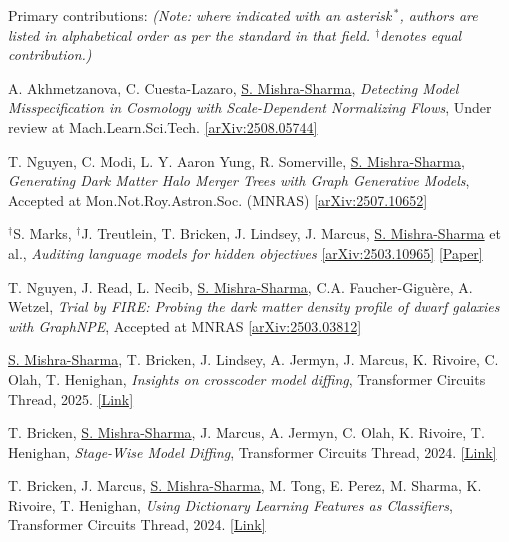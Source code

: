 \documentclass[letterpaper,11pt]{article}
\newenvironment{packed_enumerate}[1][]{
\begin{etaremune}[#1]
  \setlength{\itemsep}{4.0pt}
  \setlength{\parskip}{0pt}
  \setlength{\parsep}{0pt}}{\end{etaremune}
}
\begin{document}
\noindent
Primary contributions: \emph{(Note: where indicated with an asterisk\,$^*$, authors are listed in alphabetical order as per the standard in that field. $^{\dagger}$denotes equal contribution.)}

\begin{packed_enumerate}[start=56]

\item A. Akhmetzanova, C. Cuesta-Lazaro, \underline{S. Mishra-Sharma}, \emph{Detecting Model Misspecification in Cosmology with Scale-Dependent Normalizing Flows}, Under review at Mach.Learn.Sci.Tech.  \href{https://arxiv.org/abs/2508.05744}{[arXiv:2508.05744]}

\item T. Nguyen, C. Modi, L. Y. Aaron Yung, R. Somerville, \underline{S. Mishra-Sharma}, \emph{Generating Dark Matter Halo Merger Trees with Graph Generative Models}, Accepted at Mon.Not.Roy.Astron.Soc. (MNRAS) \href{https://arxiv.org/abs/2507.10652}{[arXiv:2507.10652]}

\item $^{\dagger}$S. Marks, $^{\dagger}$J. Treutlein, T. Bricken, J. Lindsey, J. Marcus, \underline{S. Mishra-Sharma}  et al., \emph{Auditing language models for hidden objectives} \href{https://arxiv.org/abs/2503.10965}{[arXiv:2503.10965]} \href{https://assets.anthropic.com/m/317564659027fb33/original/Auditing-Language-Models-for-Hidden-Objectives.pdf}{[Paper]}
\item T. Nguyen, J. Read, L. Necib, \underline{S. Mishra-Sharma}, C.A. Faucher-Giguère, A. Wetzel, \emph{Trial by FIRE: Probing the dark matter density profile of dwarf galaxies with GraphNPE}, Accepted at MNRAS \href{https://arxiv.org/abs/2503.03812}{[arXiv:2503.03812]}

\item \underline{S. Mishra-Sharma}, T. Bricken, J. Lindsey, A. Jermyn, J. Marcus, K. Rivoire, C. Olah, T. Henighan, \emph{Insights on crosscoder model diffing}, Transformer Circuits Thread, 2025. \href{https://transformer-circuits.pub/2025/crosscoder-diffing-update/index.html}{[Link]}
\item T. Bricken, \underline{S. Mishra-Sharma}, J. Marcus, A. Jermyn, C. Olah, K. Rivoire, T. Henighan, \emph{Stage-Wise Model Diffing}, Transformer Circuits Thread, 2024. \href{https://transformer-circuits.pub/2024/model-diffing/index.html}{[Link]}
\item T. Bricken, J. Marcus, \underline{S. Mishra-Sharma}, M. Tong, E. Perez, M. Sharma, K. Rivoire, T. Henighan, \emph{Using Dictionary Learning Features as Classifiers}, Transformer Circuits Thread, 2024. \href{https://transformer-circuits.pub/2024/features-as-classifiers/index.html}{[Link]}


\end{packed_enumerate}
\end{document}

